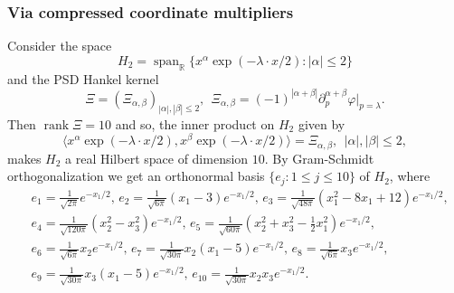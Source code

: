 \documentclass[11pt,reqno]{amsart}
\theoremstyle{plain}
\theoremstyle{definition}
\numberwithin{equation}{section}
\begin{document}
\subsubsection{Via compressed coordinate multipliers}
Consider the space 
$$H_2 = \operatorname{span}_\mathbb{R}\{x^\alpha \exp(-\lambda \cdot x/2) : |\alpha| \leq 2 \}$$ and the PSD Hankel kernel 
$$
\Xi = (\Xi_{\alpha, \beta})_{|\alpha|, |\beta| \leq 2}, \ \ \Xi_{\alpha, \beta} = (-1)^{|\alpha + \beta|} \partial^{\alpha + \beta}_p\varphi|_{p=\lambda}.
$$
Then $\operatorname{rank} \Xi =10$ and so, the inner product on $H_2$ given by
$$
\langle x^\alpha \exp(-\lambda \cdot x/2) , x^\beta \exp(-\lambda \cdot x/2)  \rangle = \Xi_{\alpha, \beta} , \ \ |\alpha|, |\beta| \leq 2, 
$$
makes $H_2$ a real Hilbert space of dimension $10$. 
By Gram-Schmidt orthogonalization we get an orthonormal basis $\{e_j : 1\leq j \leq 10\}$ of $H_2$, where
\begin{align*}
    & e_1 = \frac{1}{\sqrt{2\pi}} e^{-x_1/2},\, e_2 = \frac{1}{\sqrt{6\pi}} (x_1 - 3) e^{-x_1/2},\, e_3 = \frac{1}{\sqrt{48\pi}} (x_1^2 - 8x_1 + 12) e^{-x_1/2}, \\
    & e_4 = \frac{1}{\sqrt{120\pi}} (x_2^2 - x_3^2) e^{-x_1/2}, \, e_5 = \frac{1}{\sqrt{60\pi}} \left(x_2^2 + x_3^2 - \frac{1}{2}x_1^2\right) e^{-x_1/2}, \\
    & e_6 = \frac{1}{\sqrt{6\pi}} x_2 e^{-x_1/2}, \, e_7 = \frac{1}{\sqrt{30\pi}} x_2(x_1 - 5) e^{-x_1/2}, \,  e_8 = \frac{1}{\sqrt{6\pi}} x_3 e^{-x_1/2}, \\
    & e_9 = \frac{1}{\sqrt{30\pi}} x_3(x_1 - 5) e^{-x_1/2}, \, e_{10} = \frac{1}{\sqrt{30\pi}} x_2x_3 e^{-x_1/2}.   
\end{align*}
\end{document}
